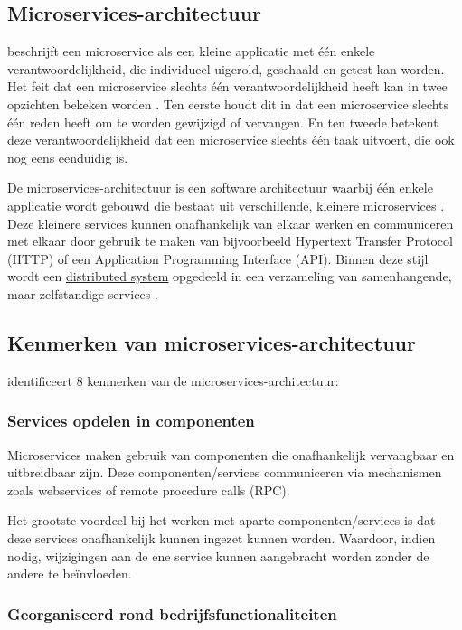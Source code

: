 \subsection{Microservices-architectuur}


\textcite{Thoenes2015} beschrijft een microservice als een kleine applicatie met één enkele verantwoordelijkheid, die individueel uigerold, geschaald en getest kan worden. Het feit dat een microservice slechts één verantwoordelijkheid heeft kan in twee opzichten bekeken worden \autocite{Thoenes2015}. Ten eerste houdt dit in dat een microservice slechts één reden heeft om te worden gewijzigd of vervangen. En ten tweede betekent deze verantwoordelijkheid dat een microservice slechts één taak uitvoert, die ook nog eens eenduidig is.

De microservices-architectuur is een software architectuur waarbij één enkele applicatie wordt gebouwd die bestaat uit verschillende, kleinere microservices \autocite{Lewis2014}. Deze kleinere services kunnen onafhankelijk van elkaar werken en communiceren met elkaar door gebruik te maken van bijvoorbeeld Hypertext Transfer Protocol (HTTP) of een Application Programming Interface (API). Binnen deze stijl wordt een \hyperref[sec:dissys]{distributed system} opgedeeld in een verzameling van samenhangende, maar zelfstandige services \autocite{Limon2018}.

\subsection{Kenmerken van microservices-\-architectuur}

\textcite{Bakshi2017} identificeert 8 kenmerken van de microservices-architectuur:

\subsubsection{Services opdelen in componenten}

Microservices maken gebruik van componenten die onafhankelijk vervangbaar en uitbreidbaar zijn. Deze componenten/services communiceren via mechanismen zoals webservices of remote procedure calls (RPC).

Het grootste voordeel bij het werken met aparte componenten/services is dat deze services onafhankelijk kunnen ingezet kunnen worden. Waardoor, indien nodig, wijzigingen aan de ene service kunnen aangebracht worden zonder de andere te beïnvloeden.

\subsubsection{Georganiseerd rond bedrijfsfunctionaliteiten}

